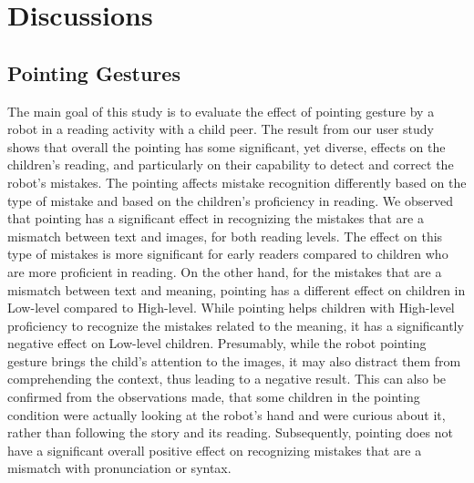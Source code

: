 \documentclass{sigchi}
\begin{document}
\section{Discussions}

\subsection{Pointing Gestures}
The main goal of this study is to evaluate the effect of pointing gesture by a robot in a reading activity with a child peer. 
The result from our user study shows that overall the pointing has some significant, yet diverse, effects on the children's reading, and particularly on their capability to detect and correct the robot's mistakes. 
The pointing affects mistake recognition differently based on the type of mistake and based on the children's proficiency in reading.
We observed that pointing has a significant effect in recognizing the mistakes that are a mismatch between text and images, for both reading levels. 
The effect on this type of mistakes is more significant for early readers compared to children who are more proficient in reading. 
On the other hand, for the mistakes that are a mismatch between text and meaning, pointing has a different effect on children in Low-level compared to High-level.
While pointing helps children with High-level proficiency to recognize the mistakes related to the meaning, it has a significantly negative effect on Low-level children.
Presumably, while the robot pointing gesture brings the child's attention to the images, it may also distract them from comprehending the context, thus leading to a negative result. 
This can also be confirmed from the observations made, that some children in the pointing condition were actually looking at the robot's hand and were curious about it, rather than following the story and its reading.
Subsequently, pointing does not have a significant overall positive effect on recognizing mistakes that are a mismatch with pronunciation or syntax.
\end{document}
